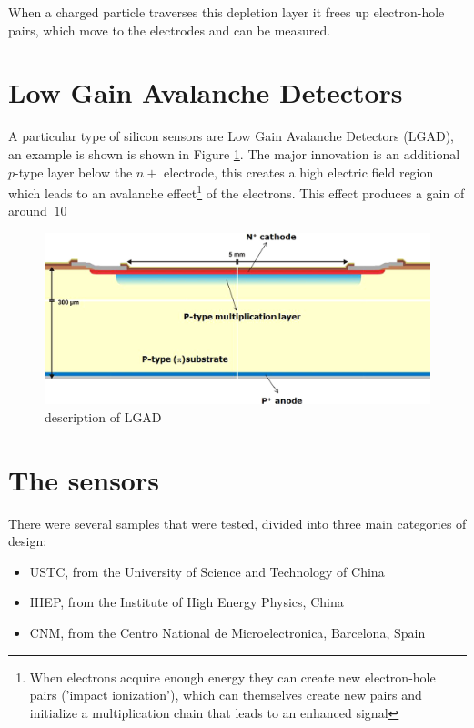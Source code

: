 When a charged particle traverses this depletion layer it frees up electron-hole pairs, which move to the electrodes and can be measured. 

\section{Low Gain Avalanche Detectors}

A particular type of silicon sensors are Low Gain Avalanche Detectors (LGAD), an example is shown is shown in Figure \ref{fig:LGADs_schema}. The major innovation is an additional $p$-type layer below the $n+$ electrode, this creates a high electric field region which leads to an avalanche effect\footnote[2]{When electrons acquire enough energy they can create new electron-hole pairs ('impact ionization'), which can themselves create new pairs and initialize a multiplication chain that leads to an enhanced signal} of the electrons. This effect produces a gain of around $~10$  

\begin{figure}[!ht]
    \centering
    \includegraphics[width=.9\linewidth]{Images/LGADs/1-s2.0-S0168900214007128-gr1_lrg.jpg}
    \caption{description of LGAD}
    \label{fig:LGADs_schema}
\end{figure}

\section{The sensors}
There were several samples that were tested, divided into three main categories of design:
\begin{itemize}
    \item USTC, from the University of Science and Technology of China
    \item IHEP, from the Institute of High Energy Physics, China
    \item CNM, from the Centro National de Microelectronica, Barcelona, Spain
\end{itemize}

